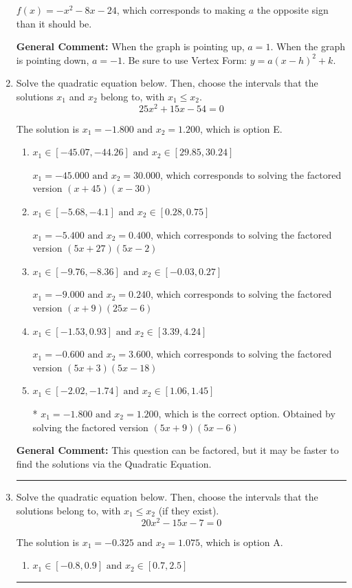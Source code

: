 \documentclass{extbook}[14pt]
\newcommand{\litem}[1]{\item #1

\rule{\textwidth}{0.4pt}}
\begin{document}
\begin{enumerate}
{\begin{enumerate}[label=\Alph*.]
$f(x)=-x^{2} -8 x -24$, which corresponds to making $a$ the opposite sign than it should be.
\end{enumerate}

\textbf{General Comment:} When the graph is pointing up, $a=1$. When the graph is pointing down, $a=-1$. Be sure to use Vertex Form: $y = a(x-h)^2+k$.
}
\litem{
Solve the quadratic equation below. Then, choose the intervals that the solutions $x_1$ and $x_2$ belong to, with $x_1 \leq x_2$.
\[ 25x^{2} +15 x -54 = 0 \]

The solution is \( x_1 = -1.800 \text{ and } x_2 = 1.200 \), which is option E.\begin{enumerate}[label=\Alph*.]
\item \( x_1 \in [-45.07, -44.26] \text{ and } x_2 \in [29.85, 30.24] \)

$x_1 = -45.000 \text{ and } x_2 = 30.000$, which corresponds to solving the factored version $(x + 45)(x -30)$
\item \( x_1 \in [-5.68, -4.1] \text{ and } x_2 \in [0.28, 0.75] \)

$x_1 = -5.400 \text{ and } x_2 = 0.400$, which corresponds to solving the factored version $(5x + 27)(5x -2)$
\item \( x_1 \in [-9.76, -8.36] \text{ and } x_2 \in [-0.03, 0.27] \)

$x_1 = -9.000 \text{ and } x_2 = 0.240$, which corresponds to solving the factored version $(x + 9)(25x -6)$
\item \( x_1 \in [-1.53, 0.93] \text{ and } x_2 \in [3.39, 4.24] \)

$x_1 = -0.600 \text{ and } x_2 = 3.600$, which corresponds to solving the factored version $(5x + 3)(5x -18)$
\item \( x_1 \in [-2.02, -1.74] \text{ and } x_2 \in [1.06, 1.45] \)

* $x_1 = -1.800 \text{ and } x_2 = 1.200$, which is the correct option. Obtained by solving the factored version $(5x + 9)(5x -6)$
\end{enumerate}

\textbf{General Comment:} This question can be factored, but it may be faster to find the solutions via the Quadratic Equation.
}
\litem{
Solve the quadratic equation below. Then, choose the intervals that the solutions belong to, with $x_1 \leq x_2$ (if they exist).
\[ 20x^{2} -15 x -7 = 0 \]

The solution is \( x_1 = -0.325 \text{ and } x_2 = 1.075 \), which is option A.\begin{enumerate}[label=\Alph*.]
\item \( x_1 \in [-0.8, 0.9] \text{ and } x_2 \in [0.7, 2.5] \)


\end{enumerate}}
\end{enumerate}
\end{document}
